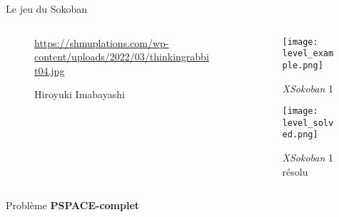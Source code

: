 



    \maketitle

    \begin{frame}{Le jeu du Sokoban}
        \begin{columns}[onlytextwidth]
            \begin{column}{0.32\textwidth}
                \begin{figure}
                    \centering
                                    {\url{https://shmuplations.com/wp-content/uploads/2022/03/thinkingrabbit04.jpg}}%
                    \caption*{Hiroyuki Imabayashi}
                \end{figure}
            \end{column}
            \begin{column}{0.6\textwidth}
                \begin{figure}
                    \centering
                    \texttt{[image: level\_example.png]}
                    \caption*{\textit{XSokoban} 1}
                    \texttt{[image: level\_solved.png]}
                    \caption*{\textit{XSokoban} 1 résolu}
                \end{figure}
            \end{column}
        \end{columns}

        \centering
        Problème \textbf{PSPACE-complet}
    \end{frame}

